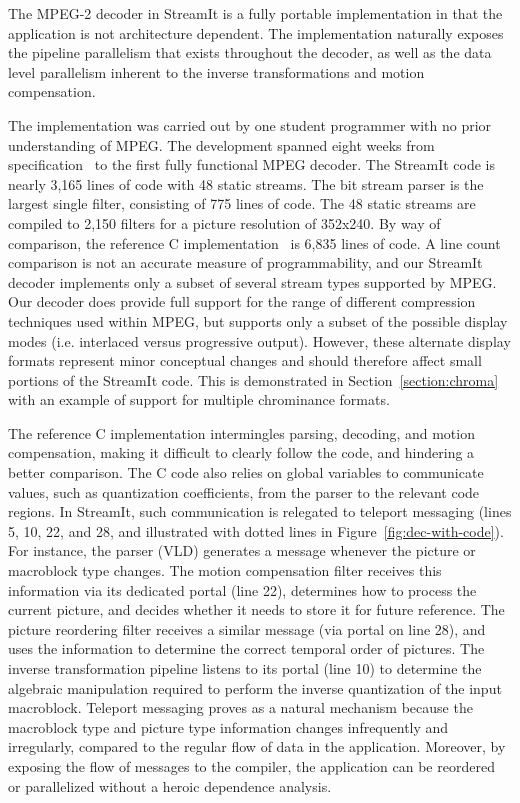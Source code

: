 The MPEG-2 decoder in StreamIt is a fully portable implementation in
that the application is not architecture dependent. The implementation
naturally exposes the pipeline parallelism that exists throughout the
decoder, as well as the data level parallelism inherent to the inverse
transformations and motion compensation.

The implementation was carried out by one student programmer with no
prior understanding of MPEG. The development spanned eight weeks from
specification~\cite{MPEG2} to the first fully functional MPEG
decoder. The StreamIt code is nearly 3,165 lines of code with 48
static streams. The bit stream parser is the largest single filter,
consisting of 775 lines of code. The 48 static streams are compiled to
2,150 filters for a picture resolution of 352x240. By way of
comparison, the reference C implementation~\cite{reference-mpeg-c} is
6,835 lines of code. A line count comparison is not an accurate
measure of programmability, and our StreamIt decoder 
implements only a subset of several stream types supported by MPEG.
Our decoder does provide full support for the range of different 
compression techniques used within MPEG, but supports only a subset 
of the possible display modes (i.e. interlaced versus progressive output).
However, these alternate display formats represent minor conceptual
changes and should therefore affect small portions of the StreamIt code. 
This is demonstrated in Section~\ref{section:chroma} with an example of
support for multiple chrominance formats. 

The reference C implementation intermingles parsing, decoding, and
motion compensation, making it difficult to clearly follow the code,
and hindering a better comparison. The C code also relies on global
variables to communicate values, such as quantization coefficients,
from the parser to the relevant code regions. In StreamIt, such
communication is relegated to teleport messaging (lines 5, 10, 22, and
28, and illustrated with dotted lines in
Figure~\ref{fig:dec-with-code}). For instance, the parser (VLD)
generates a message whenever the picture or macroblock type
changes. The motion compensation filter receives this information via
its dedicated portal (line 22), determines how to process the current
picture, and decides whether it needs to store it for future
reference. The picture reordering filter receives a similar message
(via portal on line 28), and uses the information to determine the
correct temporal order of pictures. The inverse transformation
pipeline listens to its portal (line 10) to determine the algebraic
manipulation required to perform the inverse quantization of the input
macroblock. Teleport messaging proves as a natural mechanism because
the macroblock type and picture type information changes infrequently
and irregularly, compared to the regular flow of data in the
application. Moreover, by exposing the flow of messages to the
compiler, the application can be reordered or parallelized without a
heroic dependence analysis.

